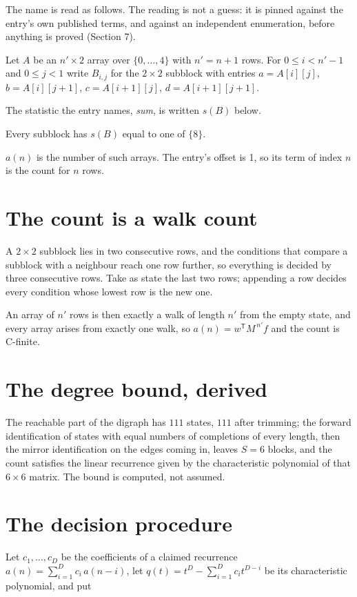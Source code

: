 \documentclass[11pt]{article}
\theoremstyle{definition}
\begin{document}
The name is read as follows. The reading is not a guess: it is pinned against the entry's own published terms, and against an independent enumeration, before anything is proved (Section 7).

Let $A$ be an $n' \times 2$ array over $\{0,\dots,4\}$ with $n' = n + 1$ rows. For $0 \le i < n'-1$ and $0 \le j < 1$ write $B_{i,j}$ for the $2\times2$ subblock with entries $a = A[i][j]$, $b = A[i][j{+}1]$, $c = A[i{+}1][j]$, $d = A[i{+}1][j{+}1]$.

The statistic the entry names, {\itshape sum}, is written $s(B)$ below.

Every subblock has $s(B)$ equal to one of $\{8\}$.

$a(n)$ is the number of such arrays. The entry's offset is 1, so its term of index $n$ is the count for $n$ rows.

\section{The count is a walk count}

A $2\times2$ subblock lies in two consecutive rows, and the conditions that compare a subblock with a neighbour reach one row further, so everything is decided by three consecutive rows. Take as state the last two rows; appending a row decides every condition whose lowest row is the new one.

An array of $n'$ rows is then exactly a walk of length $n'$ from the empty state, and every array arises from exactly one walk, so $a(n) = w^{\mathsf T}M^{\,n'}f$ and the count is C-finite.

\section{The degree bound, derived}

The reachable part of the digraph has $111$ states, $111$ after trimming; the forward identification of states with equal numbers of completions of every length, then the mirror identification on the edges coming in, leaves $S = 6$ blocks, and the count satisfies the linear recurrence given by the characteristic polynomial of that $6\times6$ matrix. The bound is computed, not assumed.

\section{The decision procedure}

Let $c_1,\dots,c_D$ be the coefficients of a claimed recurrence $a(n) = \sum_{i=1}^{D} c_i\,a(n-i)$, let $q(t) = t^{D} - \sum_{i=1}^{D} c_i t^{D-i}$ be its characteristic polynomial, and put
\end{document}
